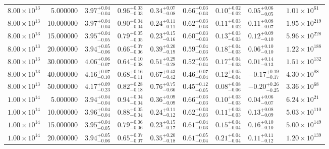 \begin{tabular}{lrlllllll}
$8.00 \times 10^{13}$ & 5.000000 & $3.97^{+0.04}_{-0.04}$ & $0.96^{+0.03}_{-0.03}$ & $0.34^{+0.07}_{-0.08}$ & $0.66^{+0.03}_{-0.03}$ & $0.10^{+0.02}_{-0.02}$ & $0.05^{+0.06}_{-0.05}$ & $1.01 \times 10^{61}$ \\
$8.00 \times 10^{13}$ & 10.000000 & $3.97^{+0.04}_{-0.04}$ & $0.90^{+0.04}_{-0.04}$ & $0.24^{+0.11}_{-0.11}$ & $0.62^{+0.03}_{-0.03}$ & $0.11^{+0.03}_{-0.02}$ & $0.11^{+0.08}_{-0.07}$ & $1.95 \times 10^{219}$ \\
$8.00 \times 10^{13}$ & 15.000000 & $3.95^{+0.04}_{-0.05}$ & $0.79^{+0.05}_{-0.05}$ & $0.23^{+0.15}_{-0.16}$ & $0.60^{+0.03}_{-0.03}$ & $0.13^{+0.03}_{-0.03}$ & $0.12^{+0.09}_{-0.10}$ & $5.96 \times 10^{228}$ \\
$8.00 \times 10^{13}$ & 20.000000 & $3.94^{+0.05}_{-0.06}$ & $0.66^{+0.07}_{-0.06}$ & $0.39^{+0.20}_{-0.19}$ & $0.59^{+0.04}_{-0.03}$ & $0.18^{+0.04}_{-0.03}$ & $0.06^{+0.10}_{-0.10}$ & $1.22 \times 10^{188}$ \\
$8.00 \times 10^{13}$ & 30.000000 & $4.06^{+0.06}_{-0.07}$ & $0.64^{+0.10}_{-0.08}$ & $0.51^{+0.29}_{-0.28}$ & $0.52^{+0.05}_{-0.04}$ & $0.17^{+0.04}_{-0.03}$ & $0.01^{+0.14}_{-0.13}$ & $1.51 \times 10^{132}$ \\
$8.00 \times 10^{13}$ & 40.000000 & $4.16^{+0.07}_{-0.10}$ & $0.68^{+0.16}_{-0.11}$ & $0.67^{+0.43}_{-0.42}$ & $0.46^{+0.07}_{-0.04}$ & $0.12^{+0.05}_{-0.04}$ & $-0.17^{+0.19}_{-0.17}$ & $4.30 \times 10^{88}$ \\
$8.00 \times 10^{13}$ & 50.000000 & $4.17^{+0.09}_{-0.23}$ & $0.82^{+0.28}_{-0.18}$ & $0.76^{+0.75}_{-0.66}$ & $0.45^{+0.12}_{-0.05}$ & $0.08^{+0.08}_{-0.06}$ & $-0.20^{+0.26}_{-0.25}$ & $3.36 \times 10^{68}$ \\
$1.00 \times 10^{14}$ & 5.000000 & $3.94^{+0.04}_{-0.04}$ & $0.94^{+0.04}_{-0.04}$ & $0.36^{+0.09}_{-0.09}$ & $0.66^{+0.03}_{-0.03}$ & $0.10^{+0.03}_{-0.03}$ & $0.04^{+0.06}_{-0.07}$ & $6.24 \times 10^{21}$ \\
$1.00 \times 10^{14}$ & 10.000000 & $3.96^{+0.04}_{-0.04}$ & $0.88^{+0.05}_{-0.04}$ & $0.24^{+0.11}_{-0.12}$ & $0.62^{+0.03}_{-0.03}$ & $0.11^{+0.03}_{-0.03}$ & $0.13^{+0.08}_{-0.09}$ & $5.03 \times 10^{110}$ \\
$1.00 \times 10^{14}$ & 15.000000 & $3.95^{+0.04}_{-0.05}$ & $0.79^{+0.06}_{-0.06}$ & $0.23^{+0.15}_{-0.17}$ & $0.61^{+0.04}_{-0.03}$ & $0.15^{+0.04}_{-0.04}$ & $0.16^{+0.10}_{-0.10}$ & $5.00 \times 10^{149}$ \\
$1.00 \times 10^{14}$ & 20.000000 & $3.94^{+0.05}_{-0.06}$ & $0.65^{+0.07}_{-0.07}$ & $0.35^{+0.20}_{-0.18}$ & $0.61^{+0.05}_{-0.04}$ & $0.21^{+0.04}_{-0.04}$ & $0.11^{+0.11}_{-0.12}$ & $1.20 \times 10^{139}$ \\

\end{tabular}
